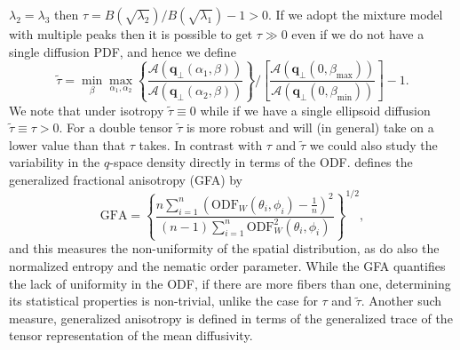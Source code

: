 \documentclass[dvips,aoas,preprint]{imsart}
\numberwithin{equation}{section}
\theoremstyle{plain}
\newcommand{\q}{\mathbf{q}}
\newcommand{\cA}{\mathcal{A}}
\begin{document}
$\lambda_2=\lambda_3$ then $\tau =
B\left(\sqrt{\lambda_2}\right)/B\left(\sqrt{\lambda_1}\right)-1>0$.
If we adopt the mixture model with multiple peaks then it is possible
to get $\tau\gg0$ even if we do not have a single diffusion PDF, and
hence we define
\begin{equation}
  \tilde{\tau} = \min_{\beta} \max_{\alpha_1,\alpha_2}
  \left\{\frac{\cA\left(\q_\perp(\alpha_1,\beta)\right)}
  {\cA\left(\q_\perp(\alpha_2,\beta)\right)}\right\} \bigg/
  \left[\frac{\cA(\q_{\perp}(0,\beta_\text{max}))}
  {\cA(\q_{\perp}(0,\beta_\text{min}))}\right] - 1.
    \label{tautilde}
\end{equation}
We note that under isotropy $\tilde\tau\equiv0$ while if we have a
single ellipsoid diffusion $\tilde\tau\equiv\tau>0$.  For a double
tensor $\tilde\tau$ is more robust and will (in general) take on a
lower value than that $\tau$ takes.  In contrast with $\tau$ and
$\tilde{\tau}$ we could also study the variability in the $q$-space
density directly in terms of the ODF.  \citet{Tuch} defines the
generalized fractional anisotropy (GFA) by
\begin{equation}
  \text{GFA} = \left\{\frac{n\sum_{i=1}^{n}
      \left(\text{ODF}_W(\theta_i,\phi_i) - \frac{1}{n}\right)^2}
    {(n-1)\sum_{i=1}^n\text{ODF}_W^2(\theta_i,\phi_i)}\right\}^{1/2},
\end{equation}
and this measures the non-uniformity of the spatial distribution, as
do also the normalized entropy and the nematic order parameter. While
the GFA quantifies the lack of uniformity in the ODF, if there are
more fibers than one, determining its statistical properties is
non-trivial, unlike the case for $\tau$ and $\tilde{\tau}$.  Another
such measure, generalized anisotropy \citep{Ozarslan2005} is defined
in terms of the generalized trace of the tensor representation of the
mean diffusivity.  
\end{document}
